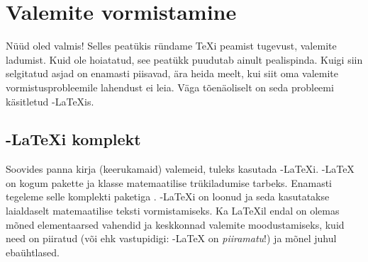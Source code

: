 %
%
%
%

\chapter{Valemite vormistamine}

\begin{intro}
Nüüd oled valmis! Selles peatükis ründame \TeX i peamist tugevust,
valemite ladumist. Kuid ole hoiatatud, see peatükk puudutab ainult
pealispinda. Kuigi siin selgitatud asjad on enamasti piisavad, ära heida
meelt, kui siit oma valemite vormistusprobleemile lahendust ei leia.
Väga tõenäoliselt on seda probleemi käsitletud \AmS-\LaTeX is.
\end{intro}

\section{\texorpdfstring{\AmS}{AMS}-\LaTeX i komplekt}

Soovides panna kirja (keerukamaid) valemeid, tuleks
kasutada \AmS-\LaTeX i. \AmS-\LaTeX{} on
kogum pakette ja klasse matemaatilise trükiladumise tarbeks. Enamasti
tegeleme selle komplekti paketiga . \AmS-\LaTeX i on loonud
 ja seda kasutatakse laialdaselt
matemaatilise teksti vormistamiseks. Ka \LaTeX il endal on olemas mõned
elementaarsed vahendid ja keskkonnad valemite moodustamiseks, kuid need
on piiratud (või ehk vastupidigi: \AmS-\LaTeX{} on \emph{piiramatu}!) ja
mõnel juhul ebaühtlased.

